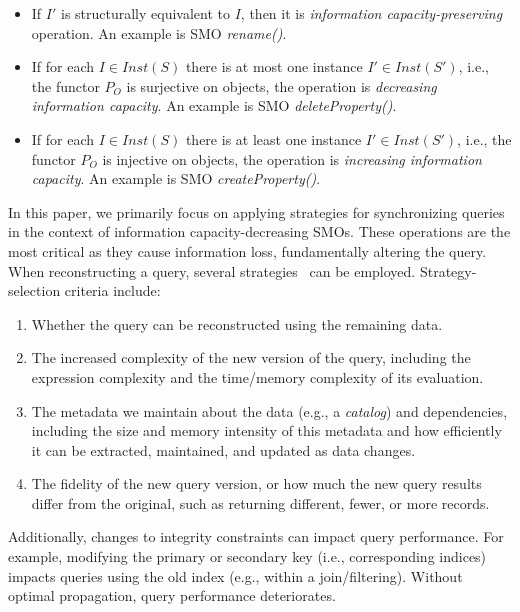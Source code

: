\begin{itemize}
    \item If $I'$ is structurally equivalent to $I$, then it is \textit{information capacity-preserving} operation. An example is SMO \textit{rename()}.
    \item If for each $I \in Inst(S)$ there is at most one instance $I' \in Inst(S')$, i.e., the functor $P_O$ is surjective on objects, the operation is \textit{decreasing information capacity}. An example is SMO \textit{deleteProperty()}.
    \item If for each $I \in Inst(S)$ there is at least one instance $I' \in Inst(S')$, i.e., the functor $P_O$ is injective on objects, the operation is \textit{increasing information capacity}. An example is SMO \textit{createProperty()}.
\end{itemize}

In this paper, we primarily focus on applying strategies for synchronizing queries in the context of information capacity-decreasing SMOs. These operations are the most critical as they cause information loss, fundamentally altering the query. When reconstructing a query, several strategies~\citep{DBLP:conf/er/CaruccioPT18,DBLP:conf/foiks/Ravve16,DBLP:journals/corr/abs-2403-09060} can be employed. Strategy-selection criteria include:

\begin{enumerate}
    \item Whether the query can be reconstructed using the remaining data.
    \item The increased complexity of the new version of the query, including the expression complexity and the time/memory complexity of its evaluation.
    \item The metadata we maintain about the data (e.g., a \textit{catalog}) and dependencies, including the size and memory intensity of this metadata and how efficiently it can be extracted, maintained, and updated as data changes.
    \item The fidelity of the new query version, or how much the new query results differ from the original, such as returning different, fewer, or more records.
\end{enumerate}

Additionally, changes to integrity constraints can impact query performance. For example, modifying the primary or secondary key (i.e., corresponding indices) impacts queries using the old index (e.g., within a join/filtering). %
Without optimal propagation, query performance deteriorates.

